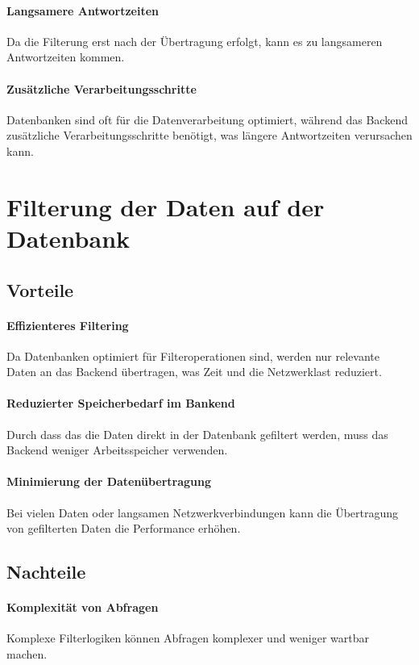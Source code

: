 \paragraph{Langsamere Antwortzeiten} Da die Filterung erst nach der Übertragung erfolgt, kann es zu langsameren Antwortzeiten kommen.
\paragraph{Zusätzliche Verarbeitungsschritte} Datenbanken sind oft für die Datenverarbeitung optimiert, während das Backend zusätzliche Verarbeitungsschritte benötigt, was längere Antwortzeiten verursachen kann.

\section{Filterung der Daten auf der Datenbank}

\subsection{Vorteile}
\paragraph{Effizienteres Filtering} Da Datenbanken optimiert für Filteroperationen sind, werden nur relevante Daten an das Backend übertragen, was Zeit und die Netzwerklast reduziert.
\paragraph{Reduzierter Speicherbedarf im Bankend} Durch dass das die Daten direkt in der Datenbank gefiltert werden, muss das Backend weniger Arbeitsspeicher verwenden.
\paragraph{Minimierung der Datenübertragung} Bei vielen Daten oder langsamen Netzwerkverbindungen kann die Übertragung von gefilterten Daten die Performance erhöhen.

\subsection{Nachteile}
\paragraph{Komplexität von Abfragen} Komplexe Filterlogiken können Abfragen komplexer und weniger wartbar machen.
